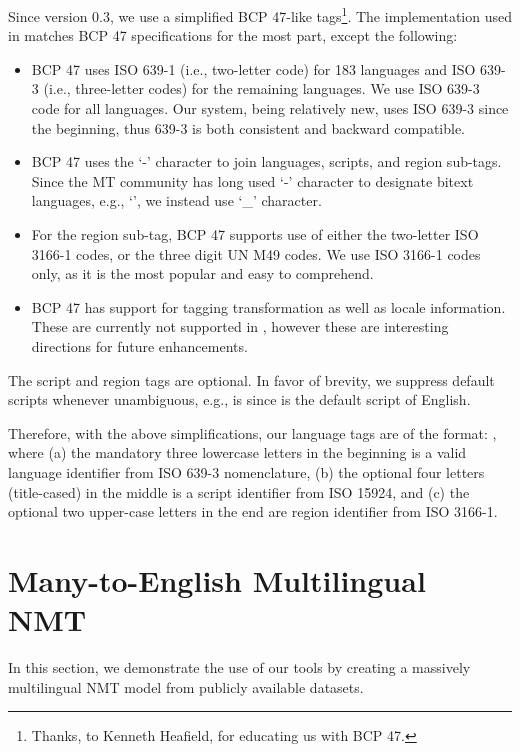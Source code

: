 Since \mtdata{} version 0.3, we use a simplified BCP 47-like tags\footnote{Thanks, to Kenneth Heafield, for educating us with BCP 47.}. The implementation used in \mtdata{} matches BCP 47 specifications for the most part, except the following:
\begin{itemize}
    \item BCP 47 uses ISO 639-1 (i.e., two-letter code) for 183 languages and ISO 639-3 (i.e., three-letter codes) for the remaining languages. We use ISO 639-3 code for all languages. Our system, being relatively new, uses ISO 639-3 since the beginning, thus 639-3 is both consistent and backward compatible. 
    
    \item BCP 47 uses the `-' character to join languages, scripts, and region sub-tags. Since the MT community has long used `-' character to designate bitext languages, e.g., `', we instead use `\_' character.
    
    \item For the region sub-tag, BCP 47 supports use of either the two-letter ISO 3166-1 codes, or the three digit UN M49 codes. We use ISO 3166-1 codes only, as it is the most popular and easy to comprehend.
    
    \item BCP 47 has support for tagging transformation as well as locale information. These are currently not supported in \mtdata{}, however these are interesting directions for future enhancements.
\end{itemize}

The script and region tags are optional. In favor of brevity, we suppress default scripts whenever unambiguous, e.g.,  is  since  is the default script of English.

Therefore, with the above simplifications, our language tags are of the format: , where (a) the mandatory three lowercase letters in the beginning is a valid language identifier from ISO 639-3 nomenclature, (b) the optional four letters (title-cased) in the middle is a script identifier from ISO 15924, and (c) the optional two upper-case letters in the end are region identifier from ISO 3166-1.

\section{Many-to-English Multilingual NMT}
\label{sec:500-eng}
In this section, we demonstrate the use of our tools by creating a massively multilingual NMT model from publicly available datasets. 

